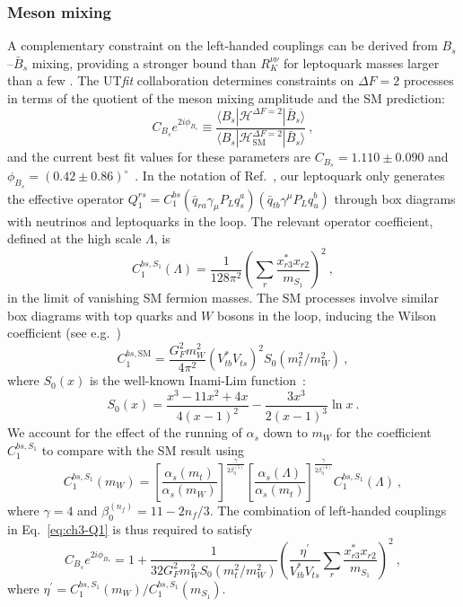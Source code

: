 \subsubsection{Meson mixing}

A complementary constraint on the left-handed couplings can be derived from
$B_s$--$\bar{B}_s$ mixing, providing a stronger bound than $R_K^{\nu\nu}$ for
leptoquark masses larger than a few \TeV. The UT\textit{fit} collaboration
determines constraints on $\Delta F = 2$ processes in terms of the quotient of
the meson mixing amplitude and the SM prediction:
\begin{equation}
  C_{B_s} e^{2i \phi_{B_s}} \equiv \frac{\langle B_s | \mathscr{H}^{\Delta F = 2} | \bar{B}_s \rangle}{\langle B_s | \mathscr{H}^{\Delta F = 2}_{\text{SM}} | \bar{B}_s \rangle} \ ,
\end{equation}
and the current best fit values for these parameters are
$C_{B_s} = 1.110 \pm 0.090$ and
$\phi_{B_s} = (0.42 \pm 0.86)^\circ$~\cite{Bona:2007vi}. In the notation of
Ref.~\cite{Bona:2007vi}, our leptoquark only generates the effective operator
$Q^{rs}_1 = C^{bs}_1(\bar{q}_{ra} \gamma_\mu P_L q_s^a)(\bar{q}_{tb} \gamma^\mu P_L q_u^b)$
through box diagrams with neutrinos and leptoquarks in the loop. The relevant
operator coefficient, defined at the high scale $\Lambda$, is
\begin{equation} \label{eq:ch3-Q1}
  C^{bs, S_{1}}_{1}(\Lambda) = \frac{1}{128 \pi^2} \left(\sum_r \frac{x_{r 3}^* x_{r 2}}{m_{S_{1}}}\right)^2 \ ,
\end{equation}
in the limit of vanishing SM fermion masses. The SM processes involve similar
box diagrams with top quarks and $W$ bosons in the loop, inducing the Wilson
coefficient (see e.g.~\cite{Fleischer:2008uj})
\begin{equation}
  C^{bs, \text{SM}}_{1} = \frac{G_F^2 m_W^2}{4\pi^2}(V_{tb}^*V_{ts})^2 S_0(m_t^2 / m_W^2) \ ,
\end{equation}
where $S_0(x)$ is the well-known Inami-Lim function~\cite{Inami:1980fz}:
\begin{equation}
  S_0(x) = \frac{x^3 -11x^2 + 4x}{4(x-1)^2} - \frac{3x^3}{2(x-1)^3} \ln x \ .
\end{equation}
We account for the effect of the running of $\alpha_s$ down to $m_W$ for the
coefficient $C^{bs, S_{1}}_{1}$ to compare with the SM result
using~\cite{Aebischer:2017gaw}
\begin{equation}
  C_1^{bs, S_{1}}(m_W) =  \left[\frac{\alpha_s(m_t)}{\alpha_s(m_W)}\right]^{\frac{\gamma}{2\beta_0^{(5)}}} \left[\frac{\alpha_s(\Lambda)}{\alpha_s(m_t)}\right]^{\frac{\gamma}{2\beta_0^{(6)}}} C_1^{bs, S_{1}}(\Lambda) \ ,
\end{equation}
where $\gamma = 4$ and $\beta_0^{(n_f)} = 11 - 2 n _f / 3$. The combination of
left-handed couplings in Eq.~\eqref{eq:ch3-Q1} is thus required to satisfy
\begin{equation} \label{eq:ch3-BsBsbar}
  C_{B_s} e^{2i \phi_{B_s}} = 1 + \frac{1}{32 G_F^2 m_W^2 S_0(m_t^2/m_W^2)} \left(  \frac{\eta^\prime}{V_{tb}^* V_{ts}} \sum_r \frac{x_{r 3}^* x_{r 2}}{m_{S_{1}}} \right)^2 \ ,
\end{equation}
where $\eta^\prime = C_1^{bs, S_{1}}(m_W) / C_1^{bs, S_{1}}(m_{S_{1}})$.


